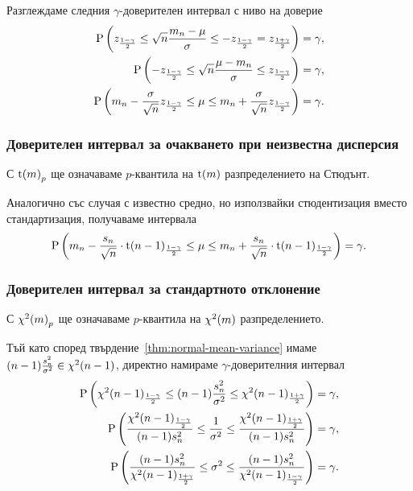 \documentclass[numbers=endperiod, bibliography=totocnumbered]{scrartcl}
\begin{document}
Разглеждаме следния \( \gamma \)-доверителен интервал с ниво на доверие
\begin{align*}
  \operatorname{P} \left( z_{\frac {1-\gamma} 2} \leq \sqrt n \frac {m_n - \mu} \sigma \leq -z_{\frac {1-\gamma} 2} = z_{\frac {1+\gamma} 2} \right) &= \gamma,
  \\
  \operatorname{P} \left( -z_{\frac {1-\gamma} 2} \leq \sqrt n \frac {\mu - m_n} \sigma \leq z_{\frac {1-\gamma} 2} \right) &= \gamma,
  \\
  \operatorname{P} \left( m_n - \frac \sigma {\sqrt n} z_{\frac {1-\gamma} 2} \leq \mu \leq m_n + \frac \sigma {\sqrt n} z_{\frac {1-\gamma} 2} \right) &= \gamma.
\end{align*}

\subsubsection{Доверителен интервал за очакването при неизвестна дисперсия}

С \( {\operatorname{t}(m)}_p \) ще означаваме \( p \)-квантила на \( \operatorname{t}(m) \) разпределението на Стюдънт.

Аналогично със случая с известно средно, но използвайки стюдентизация вместо стандартизация, получаваме интервала
\begin{align*}
  \operatorname{P} \left( m_n - \frac {s_n} {\sqrt n} \cdot {\operatorname{t}(n-1)}_{\frac {1-\gamma} 2} \leq \mu \leq m_n + \frac {s_n} {\sqrt n} \cdot {\operatorname{t}(n-1)}_{\frac {1-\gamma} 2} \right) = \gamma.
\end{align*}

\subsubsection{Доверителен интервал за стандартното отклонение}

С \( {\operatorname{\chi^2}(m)}_p \) ще означаваме \( p \)-квантила на \( \operatorname{\chi^2}(m) \) разпределението.

Тъй като според твърдение~\ref{thm:normal-mean-variance} имаме \( (n-1) \frac {s_n^2} {\sigma^2} \in \operatorname{\chi^2}(n-1) \), директно намираме \( \gamma \)-доверителния интервал
\begin{align*}
  \operatorname{P} \left( {\operatorname{\chi^2}(n-1)}_{\frac {1-\gamma} 2} \leq (n-1) \frac {s_n^2} {\sigma^2} \leq {\operatorname{\chi^2}(n-1)}_{\frac {1+\gamma} 2} \right) &= \gamma,
  \\
  \operatorname{P} \left( \frac {{\operatorname{\chi^2}(n-1)}_{\frac {1-\gamma} 2}} {(n-1) s_n^2} \leq \frac 1 {\sigma^2} \leq \frac {{\operatorname{\chi^2}(n-1)}_{\frac {1+\gamma} 2}} {(n-1) s_n^2} \right) &= \gamma,
  \\
  \operatorname{P} \left( \frac {(n-1) s_n^2} {{\operatorname{\chi^2}(n-1)}_{\frac {1+\gamma} 2}} \leq \sigma^2 \leq \frac {(n-1) s_n^2} {{\operatorname{\chi^2}(n-1)}_{\frac {1-\gamma} 2}} \right) &= \gamma.
\end{align*}

\printbibliography
\end{document}

